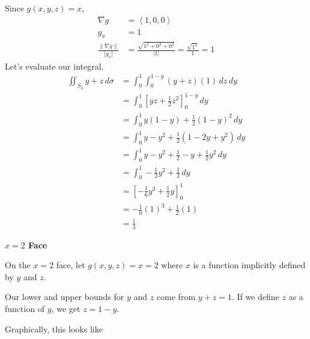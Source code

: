 \documentclass{article}
\newcommand{\lrp}[1]{\left( #1 \right)}
\newcommand{\lra}[1]{\left\langle #1 \right\rangle}
\newcommand{\lrb}[1]{\left[ #1 \right]}
\newcommand{\norm}[1]{\left\lVert #1 \right\rVert}
\begin{document}
Since $g(x,y,z)=x$,
\begin{align*}
    \nabla g &=\lra{1,0,0}\\
    g_x&=1\\
    \frac{\norm{\nabla g}}{\left|g_x\right|}&=\frac{\sqrt{1^2+0^2+0^2}}{\left|1\right|}=\frac{\sqrt{1^2}}{1}=1
\end{align*}
Let's evaluate our integral.
\begin{align*}
    \iint_{S_3} y+z\,d\sigma &=\int_0^1\int_0^{1-y}\lrp{y+z}\lrp{1}\,dz\,dy\\
    &=\int_0^1\lrb{yz+\frac{1}{2}z^2}_0^{1-y}\,dy\\
    &=\int_0^1 y(1-y)+\frac{1}{2}(1-y)^2\,dy\\
    &=\int_0^1 y-y^2 +\frac{1}{2}\lrp{1-2y+y^2}\,dy\\
    &=\int_0^1 y-y^2+\frac{1}{2}-y+\frac{1}{2}y^2\,dy\\
    &=\int_0^1 -\frac{1}{2}y^2 +\frac{1}{2}\,dy\\
    &=\lrb{-\frac{1}{6}y^3+\frac{1}{2}y}_0^1\\
    &=-\frac{1}{6}(1)^3+\frac{1}{2}(1)\\
    &=\frac{1}{3}
\end{align*}

{}\textbf{$x=2$ Face}

On the $x=2$ face, let $g(x,y,z)=x=2$ where $x$ is a function implicitly defined by $y$ and $z$. 

Our lower and upper bounds for $y$ and $z$ come from $y+z=1$. If we define $z$ as a function of $y$, we get $z=1-y$.

Graphically, this looks like
\begin{center}
\end{center}
\end{document}
